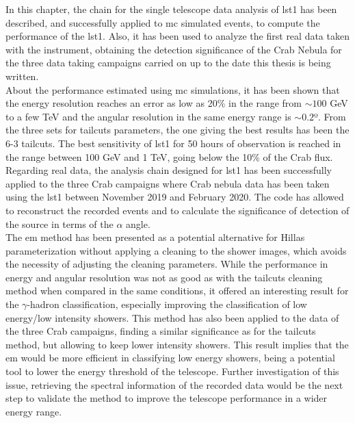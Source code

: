 \documentclass[main.tex]{subfiles}
\begin{document}
In this chapter, the chain for the single telescope data analysis of \gls{lst}1 has been described, and successfully applied to \gls{mc} simulated events, to compute the performance of the \gls{lst}1. Also, it has been used to analyze the first real data taken with the instrument, obtaining the detection significance of the Crab Nebula for the three data taking campaigns carried on up to the date this thesis is being written.\\
About the performance estimated using \gls{mc} simulations, it has been shown that the energy resolution reaches an error as low as 20\% in the range from $\sim 100$ GeV to a few TeV and the angular resolution in the same energy range is $\sim 0.2$º. From the three sets for tailcuts parameters, the one giving the best results has been the 6-3 tailcuts. The best sensitivity of \gls{lst}1 for 50 hours of observation is reached in the range between 100 GeV and 1 TeV, going below the 10\% of the Crab flux.\\
Regarding real data, the analysis chain designed for \gls{lst}1 has been successfully applied to the three Crab campaigns where Crab nebula data has been taken using the \gls{lst}1 between November 2019 and February 2020. The code has allowed to reconstruct the recorded events and to calculate the significance of detection of the source in terms of the $\alpha$ angle.\\
The \gls{em} method has been presented as a potential alternative for Hillas parameterization without applying a cleaning to the shower images, which avoids the necessity of adjusting the cleaning parameters. While the performance in energy and angular resolution was not as good as with the tailcuts cleaning method when compared in the same conditions, it offered an interesting result for the $\gamma$-hadron classification, especially improving the classification of low energy/low intensity showers.
This method has also been applied to the data of the three Crab campaigns, finding a similar significance as for the tailcuts method, but allowing to keep lower intensity showers. This result implies that the \gls{em} would be more efficient in classifying low energy showers, being a potential tool to lower the energy threshold of the telescope. Further investigation of this issue, retrieving the spectral information of the recorded data would be the next step to validate the method to improve the telescope performance in a wider energy range.
\end{document}
